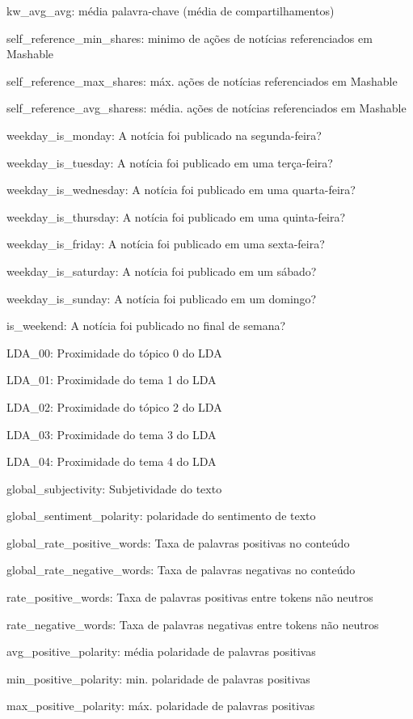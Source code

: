 \documentclass[11pt]{article}
\begin{document}
kw\_avg\_avg: média palavra-chave (média de compartilhamentos)

self\_reference\_min\_shares: minimo de ações de notícias referenciados
em Mashable

self\_reference\_max\_shares: máx. ações de notícias referenciados em
Mashable

self\_reference\_avg\_sharess: média. ações de notícias referenciados em
Mashable

weekday\_is\_monday: A notícia foi publicado na segunda-feira?

weekday\_is\_tuesday: A notícia foi publicado em uma terça-feira?

weekday\_is\_wednesday: A notícia foi publicado em uma quarta-feira?

weekday\_is\_thursday: A notícia foi publicado em uma quinta-feira?

weekday\_is\_friday: A notícia foi publicado em uma sexta-feira?

weekday\_is\_saturday: A notícia foi publicado em um sábado?

weekday\_is\_sunday: A notícia foi publicado em um domingo?

is\_weekend: A notícia foi publicado no final de semana?

LDA\_00: Proximidade do tópico 0 do LDA

LDA\_01: Proximidade do tema 1 do LDA

LDA\_02: Proximidade do tópico 2 do LDA

LDA\_03: Proximidade do tema 3 do LDA

LDA\_04: Proximidade do tema 4 do LDA

global\_subjectivity: Subjetividade do texto

global\_sentiment\_polarity: polaridade do sentimento de texto

global\_rate\_positive\_words: Taxa de palavras positivas no conteúdo

global\_rate\_negative\_words: Taxa de palavras negativas no conteúdo

rate\_positive\_words: Taxa de palavras positivas entre tokens não
neutros

rate\_negative\_words: Taxa de palavras negativas entre tokens não
neutros

avg\_positive\_polarity: média polaridade de palavras positivas

min\_positive\_polarity: min. polaridade de palavras positivas

max\_positive\_polarity: máx. polaridade de palavras positivas
\end{document}
